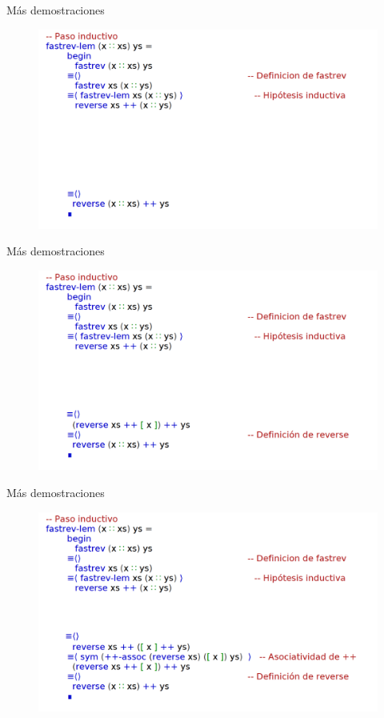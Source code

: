 \documentclass[11pt]{beamer}
\begin{document}
\begin{frame}{Más demostraciones}
\begin{figure}
\includegraphics[scale=0.65]{img/fastrev-lem-dem03}
\end{figure}
\end{frame}


\begin{frame}{Más demostraciones}
\begin{figure}
\includegraphics[scale=0.65]{img/fastrev-lem-dem04}
\end{figure}
\end{frame}


\begin{frame}{Más demostraciones}
\begin{figure}
\includegraphics[scale=0.65]{img/fastrev-lem-dem05}
\end{figure}
\end{frame}
\end{document}
